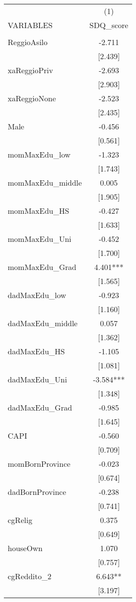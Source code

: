 \documentclass[]{article}
\begin{document}
\begin{tabular}{lc} \hline
 & (1) \\
VARIABLES & SDQ\_score \\ \hline
 &  \\
ReggioAsilo & -2.711 \\
 & [2.439] \\
xaReggioPriv & -2.693 \\
 & [2.903] \\
xaReggioNone & -2.523 \\
 & [2.435] \\
Male & -0.456 \\
 & [0.561] \\
momMaxEdu\_low & -1.323 \\
 & [1.743] \\
momMaxEdu\_middle & 0.005 \\
 & [1.905] \\
momMaxEdu\_HS & -0.427 \\
 & [1.633] \\
momMaxEdu\_Uni & -0.452 \\
 & [1.700] \\
momMaxEdu\_Grad & 4.401*** \\
 & [1.565] \\
dadMaxEdu\_low & -0.923 \\
 & [1.160] \\
dadMaxEdu\_middle & 0.057 \\
 & [1.362] \\
dadMaxEdu\_HS & -1.105 \\
 & [1.081] \\
dadMaxEdu\_Uni & -3.584*** \\
 & [1.348] \\
dadMaxEdu\_Grad & -0.985 \\
 & [1.645] \\
CAPI & -0.560 \\
 & [0.709] \\
momBornProvince & -0.023 \\
 & [0.674] \\
dadBornProvince & -0.238 \\
 & [0.741] \\
cgRelig & 0.375 \\
 & [0.649] \\
houseOwn & 1.070 \\
 & [0.757] \\
cgReddito\_2 & 6.643** \\
 & [3.197] \\

\end{tabular}
\end{document}
